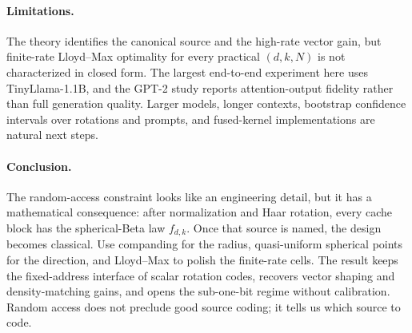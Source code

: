 \documentclass{article}
\theoremstyle{definition}
\theoremstyle{remark}
\begin{document}
\paragraph{Limitations.}
The theory identifies the canonical source and the high-rate vector
gain, but finite-rate Lloyd--Max optimality for every practical
$(d, k, N)$ is not characterized in closed form.  The largest
end-to-end experiment here uses TinyLlama-1.1B, and the GPT-2 study
reports attention-output fidelity rather than full generation
quality.  Larger models, longer contexts, bootstrap confidence
intervals over rotations and prompts, and fused-kernel
implementations are natural next steps.

\paragraph{Conclusion.}
The random-access constraint looks like an engineering detail, but
it has a mathematical consequence: after normalization and Haar
rotation, every cache block has the spherical-Beta law $f_{d, k}$.
Once that source is named, the design becomes classical.  Use
companding for the radius, quasi-uniform spherical points for the
direction, and Lloyd--Max to polish the finite-rate cells.  The
result keeps the fixed-address interface of scalar rotation codes,
recovers vector shaping and density-matching gains, and opens the
sub-one-bit regime without calibration.  Random access does not
preclude good source coding; it tells us which source to code.

\end{document}
